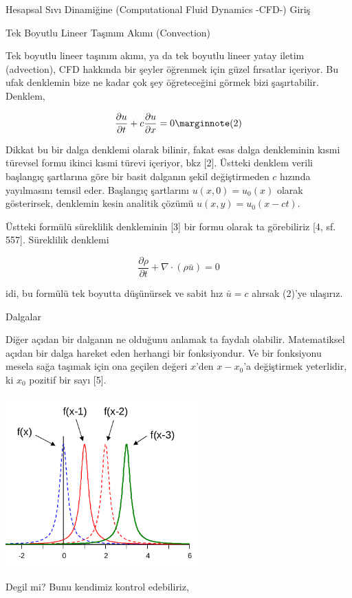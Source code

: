 \documentclass[12pt,fleqn]{article}\usepackage{../../common}
\begin{document}
Hesapsal Sıvı Dinamiğine (Computational Fluid Dynamics -CFD-) Giriş 

Tek Boyutlu Lineer Taşınım Akımı (Convection)

Tek boyutlu lineer taşınım akımı, ya da tek boyutlu lineer yatay iletim
(advection), CFD hakkında bir şeyler öğrenmek için güzel fırsatlar içeriyor. Bu
ufak denklemin bize ne kadar çok şey öğreteceğini görmek bizi
şaşırtabilir. Denklem,

$$
\frac{\partial u}{\partial t} +
c \frac{\partial u}{\partial x}  = 0
\mlabel{2}
$$

Dikkat bu bir dalga denklemi olarak bilinir, fakat esas dalga denkleminin kısmi
türevsel formu ikinci kısmi türevi içeriyor, bkz [2]. Üstteki denklem verili
başlangıç şartlarına göre bir basit dalganın şekil değiştirmeden $c$ hızında
yayılmasını temsil eder. Başlangıç şartlarını $u(x,0) = u_0(x)$ olarak
gösterirsek, denklemin kesin analitik çözümü $u(x,y) = u_0(x-ct)$.

Üstteki formülü süreklilik denkleminin [3] bir formu olarak ta görebiliriz [4, sf. 557].
Süreklilik denklemi

$$
\frac{\partial \rho}{\partial t}  + \nabla \cdot (\rho \bar{u} ) = 0
$$

idi, bu formülü tek boyutta düşünürsek ve sabit hız $\bar{u} = c$ alırsak (2)'ye ulaşırız.

Dalgalar

Diğer açıdan bir dalganın ne olduğunu anlamak ta faydalı olabilir. Matematiksel
açıdan bir dalga hareket eden herhangi bir fonksiyondur. Ve bir fonksiyonu
mesela sağa taşımak için ona geçilen değeri $x$'den $x-x_0$'a değiştirmek
yeterlidir, ki $x_0$ pozitif bir sayı [5]. 

\includegraphics[width=20em]{compscieng_app45cfd1_07.png}

Degil mi? Bunu kendimiz kontrol edebiliriz,
\end{document}
